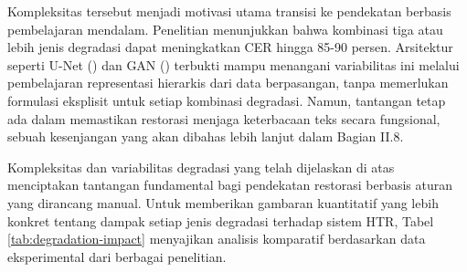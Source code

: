 \documentclass[12pt,a4paper]{article}
\begin{document}
\begin{enumerate}[leftmargin=*, labelindent=0pt, itemsep=1ex, topsep=0pt]
Kompleksitas tersebut menjadi motivasi utama transisi ke pendekatan berbasis pembelajaran mendalam. Penelitian \parencite{souibgui2022docentr} menunjukkan bahwa kombinasi tiga atau lebih jenis degradasi dapat meningkatkan CER hingga 85-90 persen. Arsitektur seperti U-Net (\parencite{ronneberger2015}) dan GAN (\parencite{goodfellow2014}) terbukti mampu menangani variabilitas ini melalui pembelajaran representasi hierarkis dari data berpasangan, tanpa memerlukan formulasi eksplisit untuk setiap kombinasi degradasi. Namun, tantangan tetap ada dalam memastikan restorasi menjaga keterbacaan teks secara fungsional, sebuah kesenjangan yang akan dibahas lebih lanjut dalam Bagian II.8.

\end{enumerate}

Kompleksitas dan variabilitas degradasi yang telah dijelaskan di atas menciptakan tantangan fundamental bagi pendekatan restorasi berbasis aturan yang dirancang manual. Untuk memberikan gambaran kuantitatif yang lebih konkret tentang dampak setiap jenis degradasi terhadap sistem HTR, Tabel \ref{tab:degradation-impact} menyajikan analisis komparatif berdasarkan data eksperimental dari berbagai penelitian.
\end{document}
